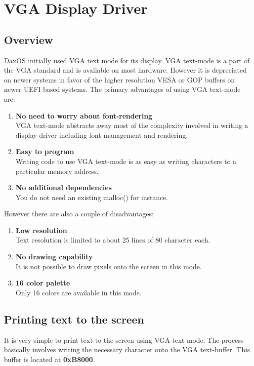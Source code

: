 \chapter{VGA Display Driver}\label{chapter:VGA Display Driver}

\section{Overview}\label{section:Overview}
DaxOS initially used VGA text mode for its display. VGA text-mode is a part of the VGA standard and is available on most hardware.
However it is depreciated on newer systems in favor of the higher resolution VESA or GOP buffers on newer UEFI based systems.
The primary advantages of using VGA text-mode are:
\begin{enumerate}
    \item \textbf{ No need to worry about font-rendering}\\
    VGA text-mode abstracts away most of the complexity involved in writing a display driver including font management and rendering.
    \item \textbf{ Easy to program}\\
    Writing code to use VGA text-mode is as easy as writing characters to a particular memory address.
    \item \textbf{ No additional dependencies}\\
    You do not need an existing malloc() for instance.
\end{enumerate}

However there are also a couple of disadvantages:
\begin{enumerate}
    \item \textbf{ Low resolution}\\
    Text resolution is limited to about 25 lines of 80 character each.
    \pagebreak
    \item \textbf{ No drawing capability}\\
    It is not possible to draw pixels onto the screen in this mode.
    \item \textbf{ 16 color palette}\\
    Only 16 colors are available in this mode.
\end{enumerate}

\section{Printing text to the screen}\label{section:Printing text to the screen}
It is very simple to print text to the screen using VGA-text mode. The process basically involves writing the necessary 
character onto the VGA text-buffer. This buffer is located at \textbf{0xB8000}.\\

